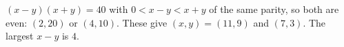 $(x-y)(x+y)=40$ with $0<x-y<x+y$ of the same parity, so both are even: $(2,20)$ or $(4,10)$. These give $(x,y)=(11,9)$ and $(7,3)$. The largest $x-y$ is $\boxed{4}$.
